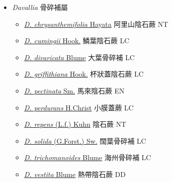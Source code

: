 
  \begin{itemize}
 \item[    ] \textit{Davallia} 骨碎補屬
                                
  \begin{itemize}
        \item[] \href{http://www.theplantlist.org/tpl1.1/search?q=Davallia+chrysanthemifolia}{\textit{D. chrysanthemifolia} Hayata}   阿里山陰石蕨   NT
        \item[] \href{http://www.theplantlist.org/tpl1.1/search?q=Davallia+cumingii}{\textit{D. cumingii} Hook.}   鱗葉陰石蕨   LC
        \item[] \href{http://www.theplantlist.org/tpl1.1/search?q=Davallia+divaricata}{\textit{D. divaricata} Blume}   大葉骨碎補   LC
        \item[] \href{http://www.theplantlist.org/tpl1.1/search?q=Davallia+griffithiana}{\textit{D. griffithiana} Hook.}   杯狀蓋陰石蕨   LC
        \item[] \href{http://www.theplantlist.org/tpl1.1/search?q=Davallia+pectinata}{\textit{D. pectinata} Sm.}   馬來陰石蕨   EN
        \item[] \href{http://www.theplantlist.org/tpl1.1/search?q=Davallia+perdurans}{\textit{D. perdurans} H.Christ}   小膜蓋蕨   LC
        \item[] \href{http://www.theplantlist.org/tpl1.1/search?q=Davallia+repens}{\textit{D. repens} (L.f.) Kuhn}   陰石蕨   NT
        \item[] \href{http://www.theplantlist.org/tpl1.1/search?q=Davallia+solida}{\textit{D. solida} (G.Forst.) Sw.}   闊葉骨碎補   LC
        \item[] \href{http://www.theplantlist.org/tpl1.1/search?q=Davallia+trichomanoides}{\textit{D. trichomanoides} Blume}   海州骨碎補   LC
        \item[] \href{http://www.theplantlist.org/tpl1.1/search?q=Davallia+vestita}{\textit{D. vestita} Blume}   熱帶陰石蕨   DD
  \end{itemize}
  \end{itemize}
